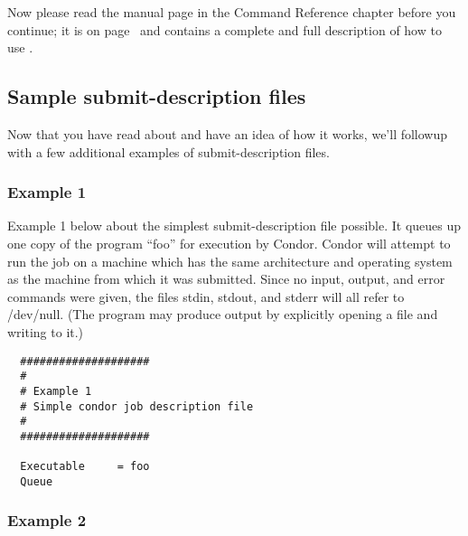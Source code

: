 Now please read the  manual page in the 
Command Reference chapter before you continue; it is on page~\pageref{man-condor-submit} and
contains a complete and full description of how to use .

\subsection{Sample submit-description files}  

Now that you have read about  and have an idea of how it
works, we'll followup with a few additional examples of submit-description files.

\subsubsection{Example 1} 

Example 1 below about the simplest submit-description
file possible. It queues up one copy of the program ``foo'' for execution
by Condor. Condor will attempt to run the job on a machine which has the
same architecture and operating system as the machine from which it was
submitted. Since no input, output, and error commands were given, the
files stdin, stdout, and stderr will all refer to /dev/null. (The
program may produce output by explicitly opening a file and writing to
it.)
\begin{verbatim}
  ####################                                                    
  # 
  # Example 1                                                                       
  # Simple condor job description file                                    
  #                                                                       
  ####################                                                    
                                                                          
  Executable     = foo                                                    
  Queue    
\end{verbatim}

\subsubsection{Example 2}

